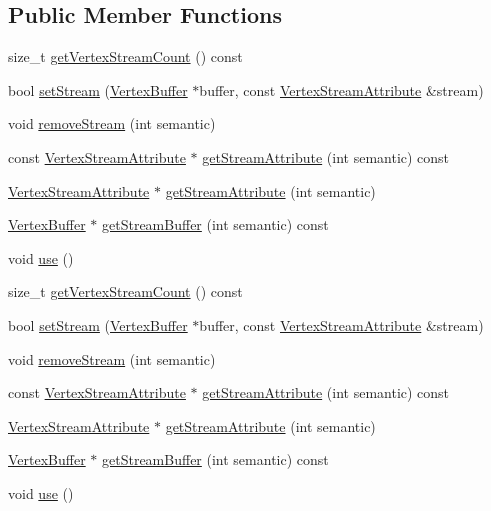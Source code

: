 \subsection*{Public Member Functions}
\begin{DoxyCompactItemize}
\item 
size\+\_\+t \hyperlink{classVertexData_a33c6eaabfec301c9e45718ab27b5a1c5}{get\+Vertex\+Stream\+Count} () const
\item 
bool \hyperlink{classVertexData_a7089b4ec262edd25dfafaaff2d915a6a}{set\+Stream} (\hyperlink{classVertexBuffer}{Vertex\+Buffer} $\ast$buffer, const \hyperlink{structVertexStreamAttribute}{Vertex\+Stream\+Attribute} \&stream)
\item 
void \hyperlink{classVertexData_a80e806241d648894e1e9992d863e20b6}{remove\+Stream} (int semantic)
\item 
const \hyperlink{structVertexStreamAttribute}{Vertex\+Stream\+Attribute} $\ast$ \hyperlink{classVertexData_a7d018c082102d57b0feaa54758e62cef}{get\+Stream\+Attribute} (int semantic) const
\item 
\hyperlink{structVertexStreamAttribute}{Vertex\+Stream\+Attribute} $\ast$ \hyperlink{classVertexData_a8e24cfbf96cf8e5086da86aa5d196c0b}{get\+Stream\+Attribute} (int semantic)
\item 
\hyperlink{classVertexBuffer}{Vertex\+Buffer} $\ast$ \hyperlink{classVertexData_a1c3f19c5ecb86192031eca7f8ee09d88}{get\+Stream\+Buffer} (int semantic) const
\item 
void \hyperlink{classVertexData_a441995cde63c9a71140645667632bc3d}{use} ()
\item 
size\+\_\+t \hyperlink{classVertexData_a33c6eaabfec301c9e45718ab27b5a1c5}{get\+Vertex\+Stream\+Count} () const
\item 
bool \hyperlink{classVertexData_a7089b4ec262edd25dfafaaff2d915a6a}{set\+Stream} (\hyperlink{classVertexBuffer}{Vertex\+Buffer} $\ast$buffer, const \hyperlink{structVertexStreamAttribute}{Vertex\+Stream\+Attribute} \&stream)
\item 
void \hyperlink{classVertexData_a80e806241d648894e1e9992d863e20b6}{remove\+Stream} (int semantic)
\item 
const \hyperlink{structVertexStreamAttribute}{Vertex\+Stream\+Attribute} $\ast$ \hyperlink{classVertexData_a8a5d0dcaf3036449fd5cc721857ef305}{get\+Stream\+Attribute} (int semantic) const
\item 
\hyperlink{structVertexStreamAttribute}{Vertex\+Stream\+Attribute} $\ast$ \hyperlink{classVertexData_a4240665844704a386ae7436f097e0cb8}{get\+Stream\+Attribute} (int semantic)
\item 
\hyperlink{classVertexBuffer}{Vertex\+Buffer} $\ast$ \hyperlink{classVertexData_ae9b78d5a039150804d83da739000ecd0}{get\+Stream\+Buffer} (int semantic) const
\item 
void \hyperlink{classVertexData_a441995cde63c9a71140645667632bc3d}{use} ()
\end{DoxyCompactItemize}
